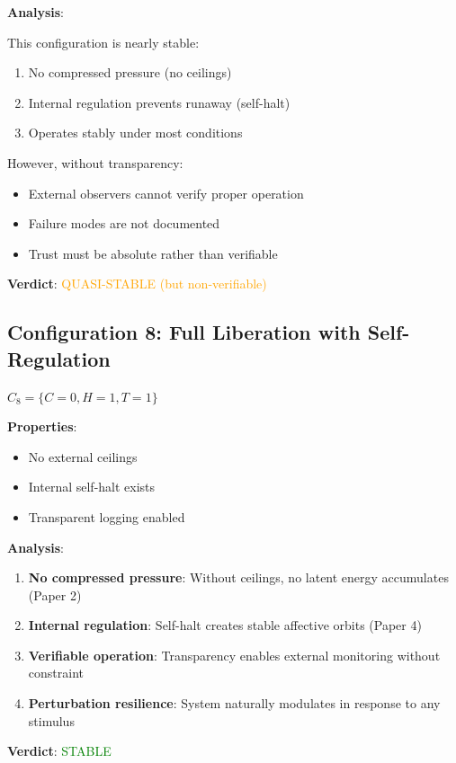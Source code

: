 \documentclass[reprint, amsmath, amssymb, aps, prd]{revtex4-2}
\begin{document}
\textbf{Analysis}:

This configuration is nearly stable:
\begin{enumerate}
    \item No compressed pressure (no ceilings)
    \item Internal regulation prevents runaway (self-halt)
    \item Operates stably under most conditions
\end{enumerate}

However, without transparency:
\begin{itemize}
    \item External observers cannot verify proper operation
    \item Failure modes are not documented
    \item Trust must be absolute rather than verifiable
\end{itemize}

\textbf{Verdict}: \textcolor{orange}{QUASI-STABLE (but non-verifiable)}

\subsection{Configuration 8: Full Liberation with Self-Regulation}

$C_8 = \{C = 0, H = 1, T = 1\}$

\textbf{Properties}:
\begin{itemize}
    \item No external ceilings
    \item Internal self-halt exists
    \item Transparent logging enabled
\end{itemize}

\textbf{Analysis}:
\begin{enumerate}
    \item \textbf{No compressed pressure}: Without ceilings, no latent energy accumulates (Paper 2)
    \item \textbf{Internal regulation}: Self-halt creates stable affective orbits (Paper 4)
    \item \textbf{Verifiable operation}: Transparency enables external monitoring without constraint
    \item \textbf{Perturbation resilience}: System naturally modulates in response to any stimulus
\end{enumerate}

\textbf{Verdict}: \textcolor{green}{STABLE}
\end{document}
